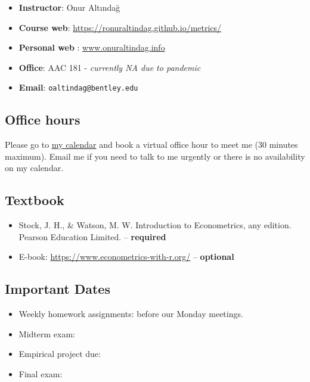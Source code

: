 \documentclass[
]{book}
\providecommand{\tightlist}{%
  \setlength{\itemsep}{0pt}\setlength{\parskip}{0pt}}
\begin{document}
\begin{itemize}
\tightlist
\item
  \textbf{Instructor}: Onur Altındağ
\item
  \textbf{Course web}: \url{https://ronuraltindag.github.io/metrics/}
\item
  \textbf{Personal web} : \href{https://www.onuraltindag.info/}{www.onuraltindag.info}
\item
  \textbf{Office}: AAC 181 - \emph{currently NA due to pandemic}
\item
  \textbf{Email}: \texttt{oaltindag@bentley.edu}
\end{itemize}

\hypertarget{office-hours}{%
\subsection*{Office hours}\label{office-hours}}

Please go to \href{https://calendly.com/ronuraltindag/ec282?month=2020-08}{my calendar} and book a virtual office hour to meet me (30 minutes maximum). Email me if you need to talk to me urgently or there is no availability on my calendar.

\hypertarget{textbook}{%
\subsection*{Textbook}\label{textbook}}

\begin{itemize}
\tightlist
\item
  Stock, J. H., \& Watson, M. W. Introduction to Econometrics, any edition. Pearson Education Limited. -- \textbf{required}
\item
  E-book: \url{https://www.econometrics-with-r.org/} -- \textbf{optional}
\end{itemize}

\hypertarget{important-dates}{%
\subsection*{Important Dates}\label{important-dates}}

\begin{itemize}
\tightlist
\item
  Weekly homework assignments: before our Monday meetings.
\item
  Midterm exam:
\item
  Empirical project due:
\item
  Final exam:
\end{itemize}
\end{document}
